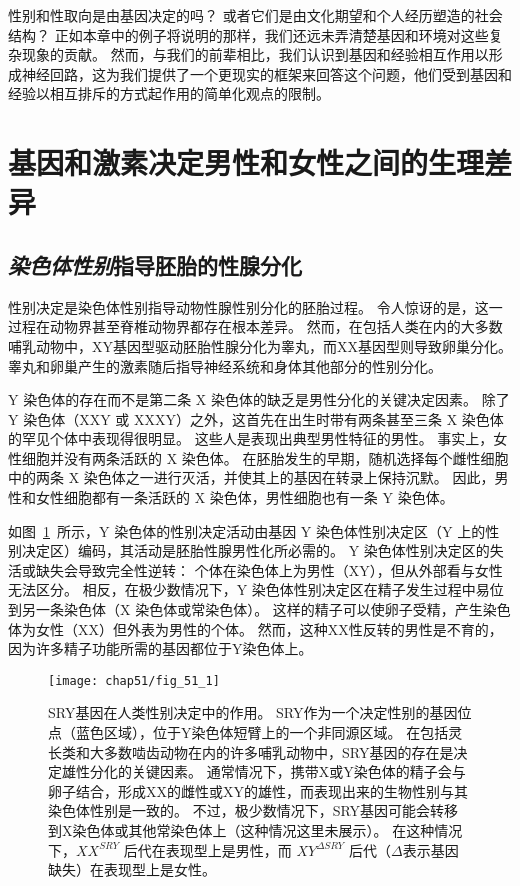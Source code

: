 性别和性取向是由基因决定的吗？
或者它们是由文化期望和个人经历塑造的社会结构？
正如本章中的例子将说明的那样，我们还远未弄清楚基因和环境对这些复杂现象的贡献。
然而，与我们的前辈相比，我们认识到基因和经验相互作用以形成神经回路，这为我们提供了一个更现实的框架来回答这个问题，他们受到基因和经验以相互排斥的方式起作用的简单化观点的限制。



\section{基因和激素决定男性和女性之间的生理差异}

\subsection{\textit{染色体性别}指导胚胎的性腺分化}

性别决定是染色体性别指导动物性腺性别分化的胚胎过程。
令人惊讶的是，这一过程在动物界甚至脊椎动物界都存在根本差异。
然而，在包括人类在内的大多数哺乳动物中，XY基因型驱动胚胎性腺分化为睾丸，而XX基因型则导致卵巢分化。
睾丸和卵巢产生的激素随后指导神经系统和身体其他部分的性别分化。


Y 染色体的存在而不是第二条 X 染色体的缺乏是男性分化的关键决定因素。
除了 Y 染色体（XXY 或 XXXY）之外，这首先在出生时带有两条甚至三条 X 染色体的罕见个体中表现得很明显。
这些人是表现出典型男性特征的男性。
事实上，女性细胞并没有两条活跃的 X 染色体。
在胚胎发生的早期，随机选择每个雌性细胞中的两条 X 染色体之一进行灭活，并使其上的基因在转录上保持沉默。
因此，男性和女性细胞都有一条活跃的 X 染色体，男性细胞也有一条 Y 染色体。


如图~\ref{fig:51_1}~所示，Y 染色体的性别决定活动由基因 Y 染色体性别决定区（Y 上的性别决定区）编码，其活动是胚胎性腺男性化所必需的。
Y 染色体性别决定区的失活或缺失会导致完全性逆转：
个体在染色体上为男性（XY），但从外部看与女性无法区分。
相反，在极少数情况下，Y 染色体性别决定区在精子发生过程中易位到另一条染色体（X 染色体或常染色体）。
这样的精子可以使卵子受精，产生染色体为女性（XX）但外表为男性的个体。
然而，这种XX性反转的男性是不育的，因为许多精子功能所需的基因都位于Y染色体上。


\begin{figure}[htbp]
	\centering
	\texttt{[image: chap51/fig\_51\_1]}
	\caption{SRY基因在人类性别决定中的作用。
		SRY作为一个决定性别的基因位点（蓝色区域），位于Y染色体短臂上的一个非同源区域。
		在包括灵长类和大多数啮齿动物在内的许多哺乳动物中，SRY基因的存在是决定雄性分化的关键因素。
		通常情况下，携带X或Y染色体的精子会与卵子结合，形成XX的雌性或XY的雄性，而表现出来的生物性别与其染色体性别是一致的。
		不过，极少数情况下，SRY基因可能会转移到X染色体或其他常染色体上（这种情况这里未展示）。
		在这种情况下，$ XX^{SRY} $ 后代在表现型上是男性，而 $XY^{\Delta SRY}$ 后代（$ \Delta $表示基因缺失）在表现型上是女性\cite{wilhelm2007sex}。}
	\label{fig:51_1}
\end{figure}


